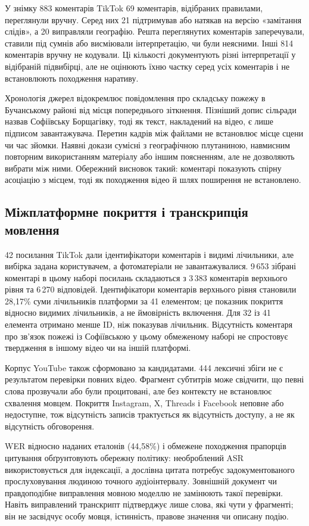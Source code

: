 У знімку 883 коментарів TikTok 69 коментарів, відібраних правилами, переглянули вручну. Серед них 21 підтримував або натякав на версію «замітання слідів», а 20 виправляли географію. Решта переглянутих коментарів заперечували, ставили під сумнів або висміювали інтерпретацію, чи були неясними. Інші 814 коментарів вручну не кодували. Ці кількості документують різні інтерпретації у відібраній підвибірці, але не оцінюють їхню частку серед усіх коментарів і не встановлюють походження наративу.

Хронологія джерел відокремлює повідомлення про складську пожежу в Бучанському районі від місця попереднього зіткнення. Пізніший допис сільради назвав Софіївську Борщагівку, тоді як текст, накладений на відео, є лише підписом завантажувача. Перетин кадрів між файлами не встановлює місце сцени чи час зйомки. Наявні докази сумісні з географічною плутаниною, навмисним повторним використанням матеріалу або іншим поясненням, але не дозволяють вибрати між ними. Обережний висновок такий: коментарі показують спірну асоціацію з місцем, тоді як походження відео й шлях поширення не встановлено.

\subsection{Міжплатформне покриття і транскрипція мовлення}

42 посилання TikTok дали ідентифікатори коментарів і видимі лічильники, але вибірка задана користувачем, а фотоматеріали не завантажувалися. 9\,653 зібрані коментарі в цьому наборі посилань складаються з 3\,383 коментарів верхнього рівня та 6\,270 відповідей. Ідентифікатори коментарів верхнього рівня становили 28,17\% суми лічильників платформи за 41 елементом; це показник покриття відносно видимих лічильників, а не ймовірність включення. Для 32 із 41 елемента отримано менше ID, ніж показував лічильник. Відсутність коментаря про зв'язок пожежі із Софіївською у цьому обмеженому наборі не спростовує твердження в іншому відео чи на іншій платформі.

Корпус YouTube також сформовано за кандидатами. 444 лексичні збіги не є результатом перевірки повних відео. Фрагмент субтитрів може свідчити, що певні слова прозвучали або були процитовані, але без контексту не встановлює схвалення мовцем. Покриття Instagram, X, Threads і Facebook неповне або недоступне, тож відсутність записів трактується як відсутність доступу, а не як відсутність обговорення.

WER відносно наданих еталонів (44,58\%) і обмежене походження прапорців цитування обґрунтовують обережну політику: необроблений ASR використовується для індексації, а дослівна цитата потребує задокументованого прослуховування людиною точного аудіоінтервалу. Зовнішній документ чи правдоподібне виправлення мовною моделлю не замінюють такої перевірки. Навіть виправлений транскрипт підтверджує лише слова, які чути у фрагменті; він не засвідчує особу мовця, істинність, правове значення чи описану подію.

